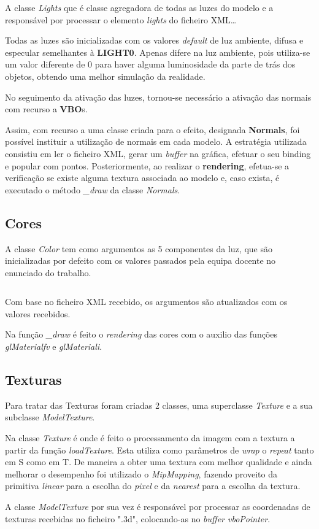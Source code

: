 \documentclass[relatorio.tex]{subfiles}
\begin{document}
A classe \textit{Lights} que é classe agregadora de todas as luzes do modelo e a
responsável por processar o elemento \textit{lights} do ficheiro XML\dots

Todas as luzes são inicializadas com os valores \textit{default} de luz ambiente,
difusa e especular semelhantes à \textbf{LIGHT0}.
Apenas difere na luz ambiente, pois utiliza-se um valor diferente de $0$ 
para haver alguma luminosidade da parte de trás dos objetos, obtendo uma 
melhor simulação da realidade.

No seguimento da ativação das luzes, tornou-se necessário a ativação das normais com
recurso a \textbf{VBO}s.

Assim, com recurso a uma classe criada para o efeito, designada \textbf{Normals},
foi possível instituir a utilização de normais em cada modelo.
A estratégia utilizada consistiu em ler o ficheiro XML, gerar um \textit{buffer}
na gráfica, efetuar o seu binding e popular com pontos.
Posteriormente, ao realizar o \textbf{rendering}, efetua-se a verificação se existe
alguma textura associada ao modelo e, caso exista, é executado o método \textit{\_draw}
da classe \textit{Normals}.

\subsection{Cores}
A classe \textit{Color} tem como argumentos as 5 componentes da luz,
que são inicializadas por defeito com os valores passados pela equipa docente
no enunciado do trabalho. 

\inputminted[firstline=19, lastline=25]{cpp}{../../Color.h}

Com base no ficheiro XML recebido, os argumentos são atualizados com os valores 
recebidos.

Na função \textit{\_draw} é feito o \textit{rendering} das cores com o auxilio das funções
\textit{glMaterialfv} e \textit{glMateriali}.

\subsection{Texturas}
Para tratar das Texturas foram criadas 2 classes, uma superclasse
\textit{Texture} e a sua subclasse \textit{ModelTexture}.

Na classe \textit{Texture} é onde é feito o processamento da imagem com a textura
a partir da função \textit{loadTexture}. Esta utiliza como parâmetros de
\textit{wrap} o \textit{repeat} tanto em S como em T. De maneira a obter
uma textura com melhor qualidade e ainda melhorar o desempenho foi utilizado
o \textit{MipMapping}, fazendo proveito da primitiva \textit{linear} para a 
escolha do \textit{pixel} e da \textit{nearest} para a escolha da textura.

A classe \textit{ModelTexture} por sua vez é responsável por processar as coordenadas de texturas
recebidas no ficheiro ".3d", colocando-as no \textit{buffer vboPointer}.
\end{document}
